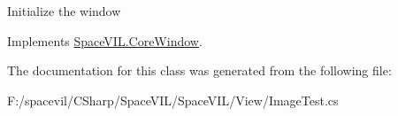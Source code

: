 Initialize the window 



Implements \mbox{\hyperlink{class_space_v_i_l_1_1_core_window_aa3cf4ac54d9651b1149584dc81042824}{Space\+V\+I\+L.\+Core\+Window}}.



The documentation for this class was generated from the following file\+:\begin{DoxyCompactItemize}
\item 
F\+:/spacevil/\+C\+Sharp/\+Space\+V\+I\+L/\+Space\+V\+I\+L/\+View/Image\+Test.\+cs\end{DoxyCompactItemize}
